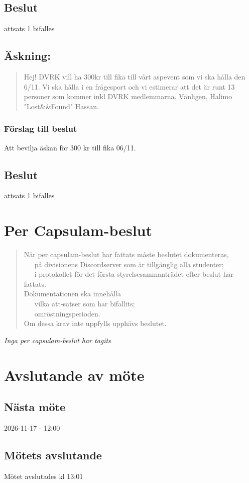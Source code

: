 \documentclass[protokoll]{dvd}
\begin{document}
\subsection{Beslut}
\begin{attsatser}
    \item attsats 1 bifalles
\end{attsatser}

\subsection{Äskning: }
\begin{quote}
Hej!
DVRK vill ha 300kr till fika till vårt aspevent som vi ska hålla den 6/11. Vi ska hålla i en frågesport och vi estimerar att det är runt 13 personer som kommer inkl DVRK medlemmarna.
Vänligen,
Halimo "Lost\&\&Found" Hassan. 
\end{quote}

\subsubsection*{Förslag till beslut}
\begin{attsatser}
    \item Att bevilja äskan för 300 kr till fika 06/11. 
\end{attsatser}
\subsection{Beslut}
\begin{attsatser}
    \item attsats 1 bifalles
\end{attsatser}



\section{Per Capsulam-beslut}
\blockquote[]{
När per capsulam-beslut har fattats måste beslutet dokumenteras,\\
\ \cdot\ \ på divisionens Discordserver som är tillgänglig alla studenter;\\
\ \cdot\ \ i protokollet för det första styrelsesammanträdet efter beslut har fattats.\\

Dokumentationen ska innehålla\\
\ \cdot\ \ vilka att-satser som har bifallits;\\
\ \cdot\ \ omröstningsperioden.\\

Om dessa krav inte uppfylls upphävs beslutet.
}

\textit{Inga per capsulam-beslut har tagits}

\newpage

\section{Avslutande av möte}

\subsection{Nästa möte}
2026-11-17 - 12:00

\subsection{Mötets avslutande}
Mötet avslutades kl 13:01 

\styrelsesignaturer
\end{document}
